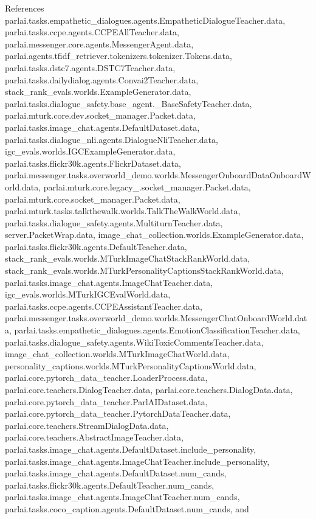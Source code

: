 References parlai.\+tasks.\+empathetic\+\_\+dialogues.\+agents.\+Empathetic\+Dialogue\+Teacher.\+data, parlai.\+tasks.\+ccpe.\+agents.\+C\+C\+P\+E\+All\+Teacher.\+data, parlai.\+messenger.\+core.\+agents.\+Messenger\+Agent.\+data, parlai.\+agents.\+tfidf\+\_\+retriever.\+tokenizers.\+tokenizer.\+Tokens.\+data, parlai.\+tasks.\+dstc7.\+agents.\+D\+S\+T\+C7\+Teacher.\+data, parlai.\+tasks.\+dailydialog.\+agents.\+Convai2\+Teacher.\+data, stack\+\_\+rank\+\_\+evals.\+worlds.\+Example\+Generator.\+data, parlai.\+tasks.\+dialogue\+\_\+safety.\+base\+\_\+agent.\+\_\+\+Base\+Safety\+Teacher.\+data, parlai.\+mturk.\+core.\+dev.\+socket\+\_\+manager.\+Packet.\+data, parlai.\+tasks.\+image\+\_\+chat.\+agents.\+Default\+Dataset.\+data, parlai.\+tasks.\+dialogue\+\_\+nli.\+agents.\+Dialogue\+Nli\+Teacher.\+data, igc\+\_\+evals.\+worlds.\+I\+G\+C\+Example\+Generator.\+data, parlai.\+tasks.\+flickr30k.\+agents.\+Flickr\+Dataset.\+data, parlai.\+messenger.\+tasks.\+overworld\+\_\+demo.\+worlds.\+Messenger\+Onboard\+Data\+Onboard\+World.\+data, parlai.\+mturk.\+core.\+legacy\+\_.\+socket\+\_\+manager.\+Packet.\+data, parlai.\+mturk.\+core.\+socket\+\_\+manager.\+Packet.\+data, parlai.\+mturk.\+tasks.\+talkthewalk.\+worlds.\+Talk\+The\+Walk\+World.\+data, parlai.\+tasks.\+dialogue\+\_\+safety.\+agents.\+Multiturn\+Teacher.\+data, server.\+Packet\+Wrap.\+data, image\+\_\+chat\+\_\+collection.\+worlds.\+Example\+Generator.\+data, parlai.\+tasks.\+flickr30k.\+agents.\+Default\+Teacher.\+data, stack\+\_\+rank\+\_\+evals.\+worlds.\+M\+Turk\+Image\+Chat\+Stack\+Rank\+World.\+data, stack\+\_\+rank\+\_\+evals.\+worlds.\+M\+Turk\+Personality\+Captions\+Stack\+Rank\+World.\+data, parlai.\+tasks.\+image\+\_\+chat.\+agents.\+Image\+Chat\+Teacher.\+data, igc\+\_\+evals.\+worlds.\+M\+Turk\+I\+G\+C\+Eval\+World.\+data, parlai.\+tasks.\+ccpe.\+agents.\+C\+C\+P\+E\+Assistant\+Teacher.\+data, parlai.\+messenger.\+tasks.\+overworld\+\_\+demo.\+worlds.\+Messenger\+Chat\+Onboard\+World.\+data, parlai.\+tasks.\+empathetic\+\_\+dialogues.\+agents.\+Emotion\+Classification\+Teacher.\+data, parlai.\+tasks.\+dialogue\+\_\+safety.\+agents.\+Wiki\+Toxic\+Comments\+Teacher.\+data, image\+\_\+chat\+\_\+collection.\+worlds.\+M\+Turk\+Image\+Chat\+World.\+data, personality\+\_\+captions.\+worlds.\+M\+Turk\+Personality\+Captions\+World.\+data, parlai.\+core.\+pytorch\+\_\+data\+\_\+teacher.\+Loader\+Process.\+data, parlai.\+core.\+teachers.\+Dialog\+Teacher.\+data, parlai.\+core.\+teachers.\+Dialog\+Data.\+data, parlai.\+core.\+pytorch\+\_\+data\+\_\+teacher.\+Parl\+A\+I\+Dataset.\+data, parlai.\+core.\+pytorch\+\_\+data\+\_\+teacher.\+Pytorch\+Data\+Teacher.\+data, parlai.\+core.\+teachers.\+Stream\+Dialog\+Data.\+data, parlai.\+core.\+teachers.\+Abstract\+Image\+Teacher.\+data, parlai.\+tasks.\+image\+\_\+chat.\+agents.\+Default\+Dataset.\+include\+\_\+personality, parlai.\+tasks.\+image\+\_\+chat.\+agents.\+Image\+Chat\+Teacher.\+include\+\_\+personality, parlai.\+tasks.\+image\+\_\+chat.\+agents.\+Default\+Dataset.\+num\+\_\+cands, parlai.\+tasks.\+flickr30k.\+agents.\+Default\+Teacher.\+num\+\_\+cands, parlai.\+tasks.\+image\+\_\+chat.\+agents.\+Image\+Chat\+Teacher.\+num\+\_\+cands, parlai.\+tasks.\+coco\+\_\+caption.\+agents.\+Default\+Dataset.\+num\+\_\+cands, and 